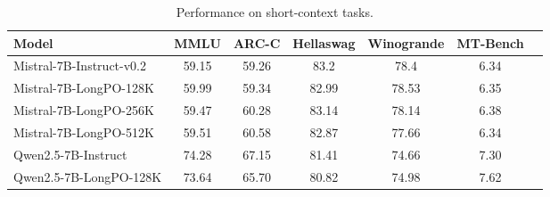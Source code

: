\begin{table}[!t]
\centering
\caption{Performance on short-context tasks.}
\begin{tabular}{l|cccccc}
\hline
Model & MMLU & ARC-C & Hellaswag & Winogrande & MT-Bench \\
\hline
Mistral-7B-Instruct-v0.2 & 59.15 & 59.26 & 83.2 & 78.4 & 6.34 \\
Mistral-7B-LongPO-128K & 59.99 & 59.34 & 82.99 & 78.53 & 6.35 \\
Mistral-7B-LongPO-256K & 59.47 & 60.28 & 83.14 & 78.14 & 6.38 \\
Mistral-7B-LongPO-512K & 59.51 & 60.58 & 82.87 & 77.66 & 6.34 \\
Qwen2.5-7B-Instruct & 74.28 & 67.15 & 81.41 & 74.66 & 7.30 \\
Qwen2.5-7B-LongPO-128K & 73.64 & 65.70 & 80.82 & 74.98 & 7.62 \\
\hline
\end{tabular}
\label{tab:short-performance}
\end{table}








